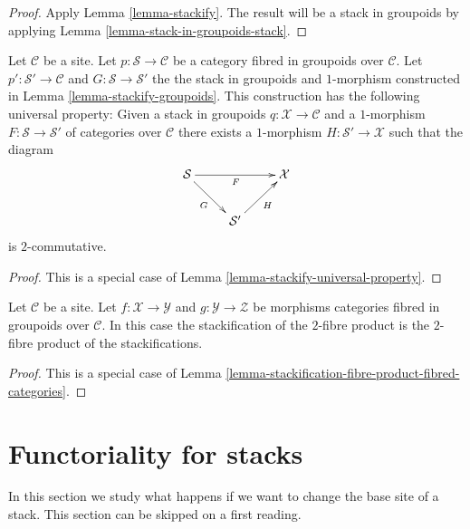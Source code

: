 \begin{proof}
Apply Lemma \ref{lemma-stackify}. The result will be a
stack in groupoids by applying Lemma \ref{lemma-stack-in-groupoids-stack}.
\end{proof}

\begin{lemma}
\label{lemma-stackify-groupoids-universal-property}
Let $\mathcal{C}$ be a site.
Let $p : \mathcal{S} \to \mathcal{C}$ be a category fibred in groupoids
over $\mathcal{C}$. Let $p' : \mathcal{S}' \to \mathcal{C}$ and
$G : \mathcal{S} \to \mathcal{S}'$
the the stack in groupoids and $1$-morphism constructed in
Lemma \ref{lemma-stackify-groupoids}.
This construction has the following universal property: Given a stack
in groupoids $q : \mathcal{X} \to \mathcal{C}$ and a $1$-morphism
$F : \mathcal{S} \to \mathcal{S}'$ of categories over $\mathcal{C}$
there exists a $1$-morphism $H : \mathcal{S}' \to \mathcal{X}$
such that the diagram
$$
\xymatrix{
\mathcal{S} \ar[rr]_F \ar[rd]_G & & \mathcal{X} \\
& \mathcal{S}' \ar[ru]_H
}
$$
is $2$-commutative.
\end{lemma}

\begin{proof}
This is a special case of
Lemma \ref{lemma-stackify-universal-property}.
\end{proof}

\begin{lemma}
\label{lemma-stackification-fibre-product-categories-fibred-in-groupoids}
Let $\mathcal{C}$ be a site.
Let $f : \mathcal{X} \to \mathcal{Y}$ and $g : \mathcal{Y} \to \mathcal{Z}$
be morphisms categories fibred in groupoids over $\mathcal{C}$.
In this case the stackification of the $2$-fibre product is the $2$-fibre
product of the stackifications.
\end{lemma}

\begin{proof}
This is a special case of
Lemma \ref{lemma-stackification-fibre-product-fibred-categories}.
\end{proof}




\section{Functoriality for stacks}
\label{section-inverse-image}

\noindent
In this section we study what happens if we want to change the base site
of a stack. This section can be skipped on a first reading.

